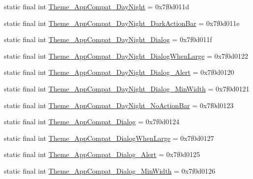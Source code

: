 \begin{DoxyCompactItemize}
\item 
static final int \mbox{\hyperlink{classandroid_1_1support_1_1v7_1_1appcompat_1_1R_1_1style_a0bd87a3cb5e158003deb1020c305c307}{Theme\+\_\+\+App\+Compat\+\_\+\+Day\+Night}} = 0x7f0d011d
\item 
static final int \mbox{\hyperlink{classandroid_1_1support_1_1v7_1_1appcompat_1_1R_1_1style_a21219f3ff51227951dcff1c9bd11f3bb}{Theme\+\_\+\+App\+Compat\+\_\+\+Day\+Night\+\_\+\+Dark\+Action\+Bar}} = 0x7f0d011e
\item 
static final int \mbox{\hyperlink{classandroid_1_1support_1_1v7_1_1appcompat_1_1R_1_1style_a29dc92c08e480c08989382431640f698}{Theme\+\_\+\+App\+Compat\+\_\+\+Day\+Night\+\_\+\+Dialog}} = 0x7f0d011f
\item 
static final int \mbox{\hyperlink{classandroid_1_1support_1_1v7_1_1appcompat_1_1R_1_1style_afba4a738702f7eac7bbd3b32e0c5b83e}{Theme\+\_\+\+App\+Compat\+\_\+\+Day\+Night\+\_\+\+Dialog\+When\+Large}} = 0x7f0d0122
\item 
static final int \mbox{\hyperlink{classandroid_1_1support_1_1v7_1_1appcompat_1_1R_1_1style_a3929f888539feb62f14e6aca27d3737f}{Theme\+\_\+\+App\+Compat\+\_\+\+Day\+Night\+\_\+\+Dialog\+\_\+\+Alert}} = 0x7f0d0120
\item 
static final int \mbox{\hyperlink{classandroid_1_1support_1_1v7_1_1appcompat_1_1R_1_1style_ac9786b603f31fd7a6c80b2549e9d238f}{Theme\+\_\+\+App\+Compat\+\_\+\+Day\+Night\+\_\+\+Dialog\+\_\+\+Min\+Width}} = 0x7f0d0121
\item 
static final int \mbox{\hyperlink{classandroid_1_1support_1_1v7_1_1appcompat_1_1R_1_1style_a5f566be860fdec27a832a1cb72e005e4}{Theme\+\_\+\+App\+Compat\+\_\+\+Day\+Night\+\_\+\+No\+Action\+Bar}} = 0x7f0d0123
\item 
static final int \mbox{\hyperlink{classandroid_1_1support_1_1v7_1_1appcompat_1_1R_1_1style_aa947f8c647b055078c8ff2b8c77e1729}{Theme\+\_\+\+App\+Compat\+\_\+\+Dialog}} = 0x7f0d0124
\item 
static final int \mbox{\hyperlink{classandroid_1_1support_1_1v7_1_1appcompat_1_1R_1_1style_a254c8c935e481bde88dba99a52d72059}{Theme\+\_\+\+App\+Compat\+\_\+\+Dialog\+When\+Large}} = 0x7f0d0127
\item 
static final int \mbox{\hyperlink{classandroid_1_1support_1_1v7_1_1appcompat_1_1R_1_1style_ac75a05a56cc31d2f09bcb4f4333ce197}{Theme\+\_\+\+App\+Compat\+\_\+\+Dialog\+\_\+\+Alert}} = 0x7f0d0125
\item 
static final int \mbox{\hyperlink{classandroid_1_1support_1_1v7_1_1appcompat_1_1R_1_1style_a7da7f25d0d41b1aedcd0191db68fba8d}{Theme\+\_\+\+App\+Compat\+\_\+\+Dialog\+\_\+\+Min\+Width}} = 0x7f0d0126

\end{DoxyCompactItemize}
